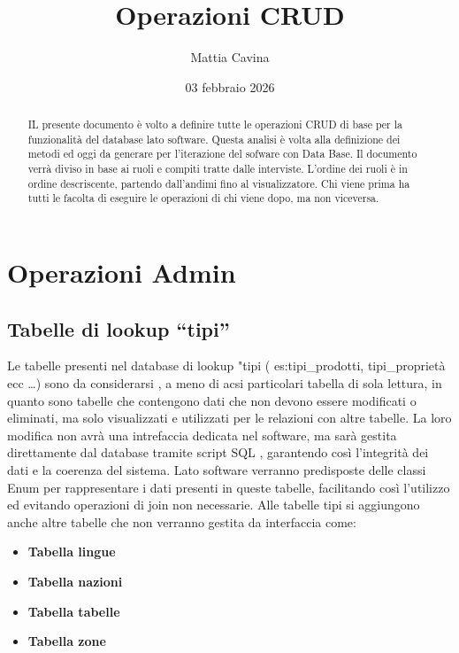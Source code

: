 \documentclass[12pt, a4paper]{article}
\title{Operazioni CRUD}
\author{Mattia Cavina}
\date{03 febbraio 2026}
\begin{document}
\begin{abstract}
    IL presente documento è volto a definire tutte le operazioni CRUD di base per la funzionalità del database lato software.
    Questa analisi è volta alla definizione dei metodi ed oggi da generare per l'iterazione del sofware con Data Base.
    Il documento verrà diviso in base ai ruoli e compiti tratte dalle interviste.
    L'ordine dei ruoli è in ordine descriscente, partendo dall'andimi fino al visualizzatore. Chi viene prima ha tutti le
    facolta di eseguire le operazioni di chi viene dopo, ma non viceversa.
\end{abstract}
\section{Operazioni Admin}
\subsection{Tabelle di lookup ``tipi''}
Le tabelle presenti nel database di lookup "tipi ( es:tipi\_prodotti, tipi\_proprietà ecc \dots) sono da considerarsi , a meno di acsi particolari tabella
di sola lettura, in quanto sono tabelle che contengono dati che non devono essere modificati o eliminati, ma solo visualizzati e utilizzati per le relazioni con altre tabelle.
La loro modifica non avrà una intrefaccia dedicata nel software, ma sarà gestita direttamente dal database tramite script SQL , garantendo così l'integrità dei dati e la coerenza del sistema.
Lato software verranno predisposte delle classi Enum per rappresentare i dati presenti in queste tabelle, facilitando così l'utilizzo ed evitando operazioni di join non necessarie.
Alle tabelle tipi si aggiungono anche altre tabelle che non verranno gestita da interfaccia come:
\begin{itemize}
    \item \textbf{Tabella lingue}
    \item \textbf{Tabella nazioni}
    \item \textbf{Tabella tabelle}
    \item \textbf{Tabella zone}
\end{itemize}
\end{document}
